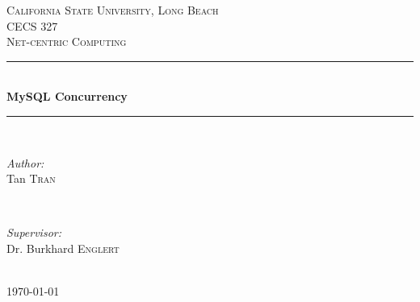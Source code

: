 \documentclass[12pt]{article} %
\begin{document}

\begin{titlepage}

\newcommand{\HRule}{\rule{\linewidth}{0.5mm}} %

\center %

\textsc{\LARGE California State University, Long Beach}\\[1.5cm] %
\textsc{\Large CECS 327}\\[0.5cm] %
\textsc{\large Net-centric Computing}\\[0.5cm] %

\HRule \\[0.4cm]
{ \huge \bfseries MySQL Concurrency}\\[0.4cm] %
\HRule \\[1.5cm]

\begin{minipage}{0.4\textwidth}
\begin{flushleft} \large
\emph{Author:}\\
Tan \textsc{Tran} %
\end{flushleft}
\end{minipage}
~
\begin{minipage}{0.4\textwidth}
\begin{flushright} \large
\emph{Supervisor:} \\
Dr. Burkhard \textsc{Englert} %
\end{flushright}
\end{minipage}\\[4cm]

{\large \today}\\[3cm] %


\vfill %

\end{titlepage}

\end{document}
